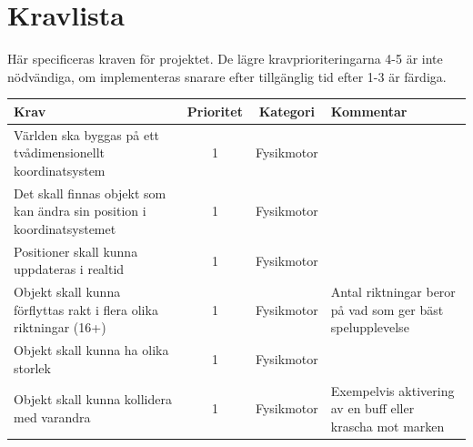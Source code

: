 \documentclass[12pt,a4paper]{article}
\begin{document}
\section{Kravlista}
Här specificeras kraven för projektet. De lägre kravprioriteringarna 4-5 är inte nödvändiga, om implementeras snarare efter tillgänglig tid efter 1-3 är färdiga. 
\begin{longtable}{ | p{3.5cm} | c | c | p{3.5cm} | }
	\hline
	Krav & Prioritet & Kategori & Kommentar  \\ 
	\hline
	Världen ska byggas på ett tvådimensionellt koordinatsystem & 1 & Fysikmotor & \\
	\hline
	Det skall finnas objekt som kan ändra sin position i koordinatsystemet & 1 & Fysikmotor & \\
	\hline
	Positioner skall kunna uppdateras i realtid & 1 & Fysikmotor & \\
	\hline
	Objekt skall kunna förflyttas rakt i flera olika riktningar (16+) & 1 & Fysikmotor & Antal riktningar beror på vad som ger bäst spelupplevelse \\
	\hline	
	Objekt skall kunna ha olika storlek & 1 & Fysikmotor & \\ 
	\hline
	Objekt skall kunna kollidera med varandra & 1 & Fysikmotor & Exempelvis aktivering av en buff eller krascha mot marken \\ \hline
	

\end{longtable}
\end{document}
